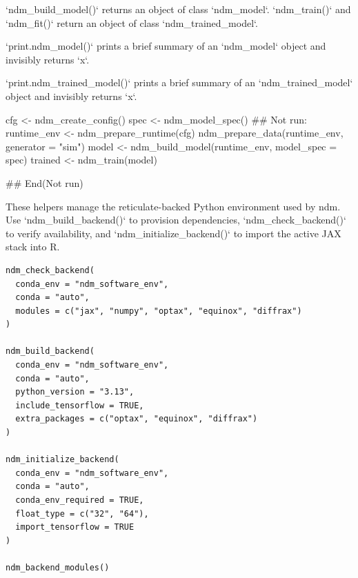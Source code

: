 \documentclass[a4paper]{book}
\begin{document}
%
\begin{Value}
`ndm\_build\_model()` returns an object of class `ndm\_model`.
`ndm\_train()` and `ndm\_fit()` return an object of class
`ndm\_trained\_model`.

`print.ndm\_model()` prints a brief summary of an `ndm\_model` object
and invisibly returns `x`.

`print.ndm\_trained\_model()` prints a brief summary of an
`ndm\_trained\_model` object and invisibly returns `x`.
\end{Value}
%
\begin{Examples}
\begin{ExampleCode}
cfg <- ndm_create_config()
spec <- ndm_model_spec()
## Not run: 
runtime_env <- ndm_prepare_runtime(cfg)
ndm_prepare_data(runtime_env, generator = "sim")
model <- ndm_build_model(runtime_env, model_spec = spec)
trained <- ndm_train(model)

## End(Not run)

\end{ExampleCode}
\end{Examples}
%
\begin{Description}
These helpers manage the reticulate-backed Python environment used by
ndm. Use `ndm\_build\_backend()` to provision dependencies,
`ndm\_check\_backend()` to verify availability, and
`ndm\_initialize\_backend()` to import the active JAX stack into R.
\end{Description}
%
\begin{Usage}
\begin{verbatim}
ndm_check_backend(
  conda_env = "ndm_software_env",
  conda = "auto",
  modules = c("jax", "numpy", "optax", "equinox", "diffrax")
)

ndm_build_backend(
  conda_env = "ndm_software_env",
  conda = "auto",
  python_version = "3.13",
  include_tensorflow = TRUE,
  extra_packages = c("optax", "equinox", "diffrax")
)

ndm_initialize_backend(
  conda_env = "ndm_software_env",
  conda = "auto",
  conda_env_required = TRUE,
  float_type = c("32", "64"),
  import_tensorflow = TRUE
)

ndm_backend_modules()
\end{verbatim}
\end{Usage}
\end{document}
